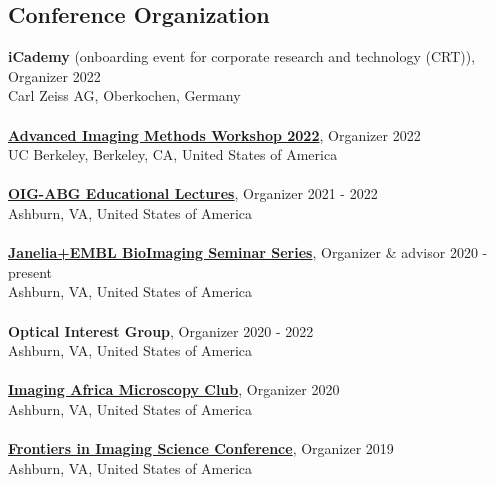 \documentclass[margin,line]{res}
\begin{document}
\begin{resume}

\section{\sc Conference Organization}

{\bf iCademy} (onboarding event for corporate research and technology (CRT)), Organizer \hfill {2022}\\
Carl Zeiss AG, Oberkochen, Germany\\
\vspace*{-3mm}\\
{\bf \href{https://crl.berkeley.edu/molecular-imaging-center/meetings-and-short-courses/}{Advanced Imaging Methods Workshop 2022}}, Organizer \hfill {2022}\\
UC Berkeley, Berkeley, CA, United States of America\\
\vspace*{-3mm}\\
{\bf \href{https://www.janelia.org/content/optical-interest-group}{OIG-ABG Educational Lectures}}, Organizer \hfill {2021 - 2022}\\
Ashburn, VA, United States of America\\
\vspace*{-3mm}\\
{\bf \href{https://www.janelia.org/node/65736}{Janelia+EMBL BioImaging Seminar Series}}, Organizer \& advisor \hfill {2020 - present}\\
Ashburn, VA, United States of America\\
\vspace*{-3mm}\\
{\bf Optical Interest Group}, Organizer \hfill {2020 - 2022}\\
Ashburn, VA, United States of America\\
\vspace*{-3mm}\\
{\bf \href{https://www.imagingafrica.org/}{Imaging Africa Microscopy Club}}, Organizer \hfill {2020}\\
Ashburn, VA, United States of America\\
\vspace*{-3mm}\\
{\bf \href{https://www.janelia.org/you-janelia/conferences/frontiers-in-imaging-science-ii}{ Frontiers in Imaging Science Conference}}, Organizer \hfill {2019}\\
Ashburn, VA, United States of America\\

\end{resume}
\end{document}
